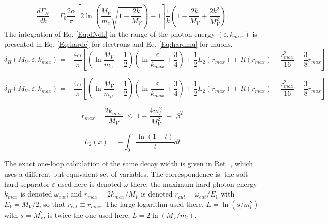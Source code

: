 \documentclass[prd,onecolumn,showpcs,amsmath,amssymb,nofootinbib,notitlepage,preprintnumbers,balancelastpage,longbibliography]{revtex4-2}
\begin{document}
\begin{equation}
\frac{d\Gamma_H}{dk} =\Gamma_0 \frac{2\alpha}{\pi} \left[ 2\ln{ \left( \frac{M_V}{m_e} \sqrt{1 - \frac{2k}{M_V}} \right) - 1} \right] \frac{1}{k}\left(1-\frac{2k}{M_V}+\frac{2k^2}{M_V^2} \right).
\label{Eq:dNdk}
\end{equation}
\noindent
The integration of Eq. \ref{Eq:dNdk} in the range of the photon energy $(\varepsilon, k_{max})$ is presented 
in Eq. \ref{Eq:harde} for electrons and Eq. \ref{Eq:hardmu} for muons. 
\begin{equation}
\delta_H(M_V,\varepsilon,k_{max}) = -\frac{4\alpha}{\pi} 
\left[
   \left( \ln\frac{M_V}{m_e}-\frac{1}{2}\right)  \left( \ln\frac{\varepsilon}{k_{max}}+\frac{3}{4} \right)+\frac{1}{2}L_2(r_{max}) + R(r_{max})  + \frac{r_{max}^2}{16}-\frac{3}{8}r_{max}
\right] 
\label{Eq:harde}
\end{equation}
\noindent

\begin{equation}
\delta_H(M_V,\varepsilon,k_{max}) = -\frac{4\alpha}{\pi} 
\left[
   \left( \ln\frac{M_V}{m_\mu}-\frac{1}{2}\right)  \left( \ln\frac{\varepsilon}{k_{max}}+\frac{3}{4} \right)+\frac{1}{2}L_2(r_{max}) + R(r_{max})  + \frac{r_{max}^2}{16}-\frac{3}{8}r_{max}
\right] 
\label{Eq:hardmu}
\end{equation}
\noindent

\begin{equation}
r_{max} = \frac{2k_{max}}{M_V}\;\le\;1-\frac{4m_l^2}{M_V^2}\;\equiv\;\beta^2
\label{Eq:rmax}
\end{equation}
\noindent

\begin{equation}
L_2(x)= -\int^x_0\frac{\ln(1-t)}{t}dt
\label{Eq:L2}
\end{equation}
\noindent

The exact one-loop calculation of the same decay width is given in
Ref.~\cite{Akushevich2026}, which uses a different but equivalent set of variables. The
correspondence is: the soft--hard separator $\varepsilon$ used here is denoted $\omega$
there; the maximum hard-photon energy $k_{max}$ is denoted $\omega_{cut}$; and
$r_{max}=2k_{max}/M_V$ is denoted $r_{cut}=\omega_{cut}/E_1$ with $E_1=M_V/2$, so that
$r_{cut}\equiv r_{max}$. The large logarithm used there, $L=\ln(s/m_l^2)$ with
$s=M_V^2$, is twice the one used here, $L=2\ln(M_V/m_l)$.
\end{document}

